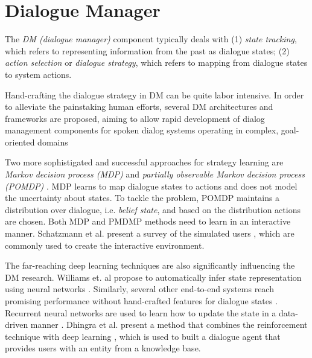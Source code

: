 \section{Dialogue Manager}

The \emph{DM (dialogue manager)} component typically deals with (1) \emph{state tracking}, which refers to representing information from the past as dialogue states; (2) \emph{action selection} or \emph{dialogue strategy}, which refers to mapping from dialogue states to system actions.

Hand-crafting the dialogue strategy in DM can be quite labor intensive. In order to alleviate the painstaking human efforts, several DM architectures and frameworks are proposed, aiming to allow rapid development of dialog management components for spoken dialog systems operating in complex, goal-oriented domains \cite{Bohus2003,Rudnicky1999a}

Two more sophistigated and successful approaches for strategy learning are \emph{Markov decision process (MDP)} \cite{Levin2000A} and \emph{partially observable Markov decision process (POMDP)} \cite{Young2013Pomdp, Gasic2011}. MDP learns to map dialogue states to actions and does not model the uncertainty about states. To tackle the problem, POMDP maintains a distribution over dialogue, i.e. \emph{belief state}, and based on the distribution actions are chosen. Both MDP and PMDMP methods need to learn in an interactive manner. Schatzmann et al. present a survey of the simulated users \cite{Schatzmann2006}, which are commonly used to create the interactive environment.

The far-reaching deep learning techniques are also significantly influencing the DM research. Williams et. al propose to automatically infer state representation using neural networks \cite{Williams2016End}. Similarly, several other end-to-end systems reach promising performance without hand-crafted features for dialogue states \cite{Bordes2016Learning}. Recurrent neural networks are used to learn how to update the state in a data-driven manner \cite{Henderson2014Word}. Dhingra et al. present a method that combines the reinforcement technique with deep learning \cite{Dhingra2016End}, which is used to built a dialogue agent that provides users with an entity from a knowledge base.












